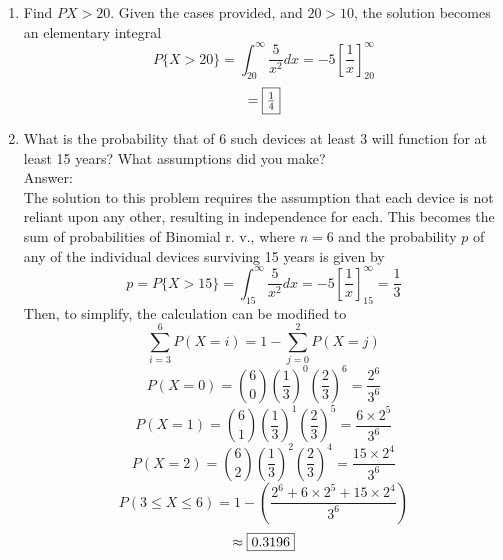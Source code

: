 \documentclass{article}
\begin{document}
\begin{enumerate}
\begin{enumerate}
                                $$ 1 = \int_{0}^{10}A/100dx + \int_{10}^{\infty}A/x^2dx $$
                                $$ 1 = A/100[x]^{10}_{0} + A(-1)[1/x]^{\infty}_{10}$$
                                $$ 1 = A/10 + A/10 = A/5 $$
                                $$ \fbox{$A = 5$} $$
                        \item   Find $P{X>20}$.
                                Given the cases provided, and $20>10$, the solution becomes an elementary integral
                                $$ P\{X>20\} = \int_{20}^{\infty} \frac{5}{x^2}dx = -5\left[\frac{1}{x}\right]^{\infty}_{20}$$
                                $$ = \fbox{$\frac{1}{4}$} $$
                        \clearpage
                        \item   What is the probability that of 6 such devices at least 3 will function for at least
                                15 years? What assumptions did you make?
                                \\Answer:\\
                                The solution to this problem requires the assumption that each device is not reliant upon 
                                any other, resulting in independence for each. This becomes the sum of probabilities of Binomial 
                                r. v., where $n = 6$ and the probability $p$ of any of the individual devices surviving 15 years 
                                is given by
                                $$ p = P\{X>15\} = \int_{15}^{\infty} \frac{5}{x^2}dx = -5\left[\frac{1}{x}\right]^{\infty}_{15} = \frac{1}{3} $$
                                Then, to simplify, the calculation can be modified to
                                $$ \sum^{6}_{i=3} P(X=i) = 1 - \sum_{j=0}^{2} P(X=j) $$
                                $$ P(X=0) = \binom{6}{0}\left(\frac{1}{3}\right)^0 \left(\frac{2}{3}\right)^6 = \frac{2^6}{3^6}$$
                                $$ P(X=1) = \binom{6}{1}\left(\frac{1}{3}\right)^1 \left(\frac{2}{3}\right)^5 = \frac{6\times2^5}{3^6}$$
                                $$ P(X=2) = \binom{6}{2}\left(\frac{1}{3}\right)^2 \left(\frac{2}{3}\right)^4 = \frac{15\times2^4}{3^6}$$
                                $$ P(3\leq X \leq 6) = 1 - \left(\frac{2^6+6\times2^5+15\times2^4}{3^6}\right) $$
                                $$ \approx \fbox{0.3196} $$
                    \end{enumerate}
\end{enumerate}
\end{document}
